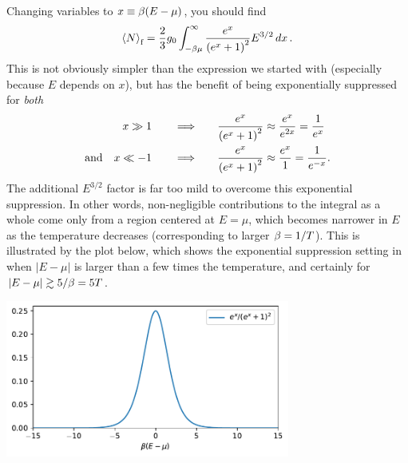 Changing variables to $x \equiv \beta(E - \mu)$, you should find
\begin{equation*}
  \left\langle N \right\rangle_{\text{f}} = \frac{2}{3} g_0 \int_{-\beta\mu}^{\infty} \frac{e^x}{\left(e^x + 1\right)^2} E^{3 / 2} \mathop{dx}.
\end{equation*}
This is not obviously simpler than the expression we started with (especially because $E$ depends on $x$), but has the benefit of being exponentially suppressed for \textit{both}
\begin{align*}
                   x \gg 1  \qquad \Longrightarrow \qquad & \frac{e^x}{\left(e^x + 1\right)^2} \approx \frac{e^x}{e^{2x}} = \frac{1}{e^x} \\
  \mbox{and} \quad x \ll -1 \qquad \Longrightarrow \qquad & \frac{e^x}{\left(e^x + 1\right)^2} \approx \frac{e^x}{1} = \frac{1}{e^{-x}}.
\end{align*}
The additional $E^{3 / 2}$ factor is far too mild to overcome this exponential suppression.
In other words, non-negligible contributions to the integral as a whole come only from a region centered at $E = \mu$, which becomes narrower in $E$ as the temperature decreases (corresponding to larger $\beta = 1 / T$).
This is illustrated by the plot below, which shows the exponential suppression setting in when $|E - \mu|$ is larger than a few times the temperature, and certainly for $|E - \mu| \gtrsim 5 / \beta = 5T$. \\[-24 pt]
\begin{center}\includegraphics[width=0.7\textwidth]{figs/unit08_Sommerfeld.pdf}\end{center}


